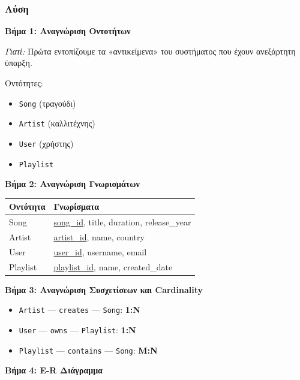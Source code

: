 \subsubsection*{Λύση}

\textbf{Βήμα 1: Αναγνώριση Οντοτήτων}

\textit{Γιατί:} Πρώτα εντοπίζουμε τα «αντικείμενα» του συστήματος που έχουν ανεξάρτητη ύπαρξη.

Οντότητες:
\begin{itemize}
    \item \texttt{Song} (τραγούδι)
    \item \texttt{Artist} (καλλιτέχνης)
    \item \texttt{User} (χρήστης)
    \item \texttt{Playlist}
\end{itemize}

\textbf{Βήμα 2: Αναγνώριση Γνωρισμάτων}

\begin{center}
\begin{tabular}{ll}
\toprule
\textbf{Οντότητα} & \textbf{Γνωρίσματα} \\
\midrule
Song & \underline{song\_id}, title, duration, release\_year \\
Artist & \underline{artist\_id}, name, country \\
User & \underline{user\_id}, username, email \\
Playlist & \underline{playlist\_id}, name, created\_date \\
\bottomrule
\end{tabular}
\end{center}

\textbf{Βήμα 3: Αναγνώριση Συσχετίσεων και Cardinality}

\begin{itemize}
    \item \texttt{Artist} --- \texttt{creates} --- \texttt{Song}: \textbf{1:N}
    \item \texttt{User} --- \texttt{owns} --- \texttt{Playlist}: \textbf{1:N}
    \item \texttt{Playlist} --- \texttt{contains} --- \texttt{Song}: \textbf{M:N}
\end{itemize}

\textbf{Βήμα 4: E-R Διάγραμμα}

